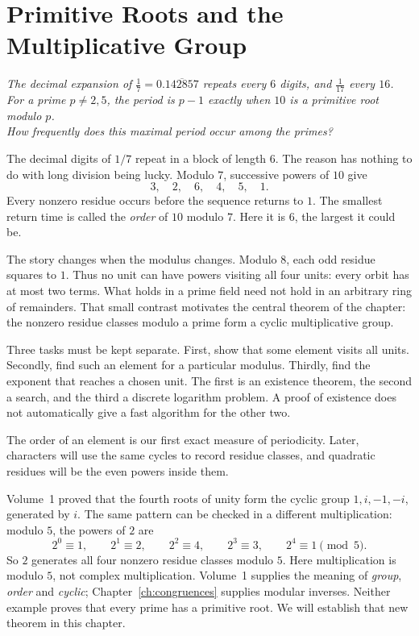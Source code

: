 \chapter{Primitive Roots and the Multiplicative Group}\label{ch:orders}

\begin{center}\itshape
The decimal expansion of $\frac17=0.\overline{142857}$ repeats every $6$ digits, and $\frac1{17}$ every $16$.\\
For a prime $p\ne2,5$, the period is $p-1$ exactly when $10$ is a primitive root modulo $p$.\\
How frequently does this maximal period occur among the primes?
\end{center}


The decimal digits of $1/7$ repeat in a block of length $6$. The reason has nothing to do with long division being lucky. Modulo $7$, successive powers of $10$ give
\[
3,\quad2,\quad6,\quad4,\quad5,\quad1.
\]
Every nonzero residue occurs before the sequence returns to $1$. The smallest return time is called the \emph{order} of $10$ modulo $7$. Here it is $6$, the largest it could be.

The story changes when the modulus changes. Modulo $8$, each odd residue squares to $1$. Thus no unit can have powers visiting all four units: every orbit has at most two terms. What holds in a prime field need not hold in an arbitrary ring of remainders. That small contrast motivates the central theorem of the chapter: the nonzero residue classes modulo a prime form a cyclic multiplicative group.

Three tasks must be kept separate. First, show that some element visits all units. Secondly, find such an element for a particular modulus. Thirdly, find the exponent that reaches a chosen unit. The first is an existence theorem, the second a search, and the third a discrete logarithm problem. A proof of existence does not automatically give a fast algorithm for the other two.

The order of an element is our first exact measure of periodicity. Later, characters will use the same cycles to record residue classes, and quadratic residues will be the even powers inside them.

\begin{reminder}
Volume~1 proved that the fourth roots of unity form the cyclic group
$1,i,-1,-i$, generated by $i$. The same pattern can be checked in a
different multiplication: modulo $5$, the powers of $2$ are
\[
2^0\equiv1,\qquad2^1\equiv2,\qquad2^2\equiv4,\qquad
2^3\equiv3,\qquad2^4\equiv1\pmod5.
\]
So $2$ generates all four nonzero residue classes modulo $5$.
Here multiplication is modulo $5$, not complex multiplication.
Volume~1 supplies the meaning of \emph{group}, \emph{order} and
\emph{cyclic}; Chapter~\ref{ch:congruences} supplies modular inverses.
Neither example proves that every prime has a primitive root.
We will establish that new theorem in this chapter.
\end{reminder}


